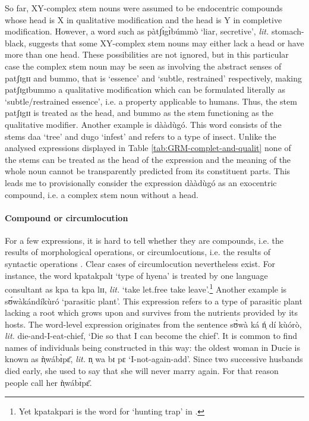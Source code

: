 \begin{exe}
\begin{exe}
\begin{exe}
\begin{exe}
\begin{exe}
\begin{exe}
So far,   XY-complex stem nouns were assumed to be  endocentric compounds whose head is X in qualitative modification and the head is Y in completive modification.  However, a word such as {\sls pàtʃɪ̀gɪ̀búmmò} `liar, secretive', {\it lit.} stomach-black, suggests that some XY-complex stem nouns may  either lack a head or have more than one head. These possibilities are not ignored, but in this particular case the complex stem noun may be seen as involving  the abstract senses of {\sls patʃɪgɪɪ} and {\sls bummo}, that is  `essence' and `subtle, restrained' respectively, making {\sls patʃɪgɪbummo} a qualitative modification  which can be formulated literally as `subtle/restrained essence', i.e.   a property applicable to humans. Thus, the stem {\sls patʃɪgɪɪ} is treated as the head, and {\sls bummo} as the stem functioning as the qualitative modifier. Another example is {\sls dààdùgó}. This word consists of the stems {\sls daa} `tree' and  {\sls dugo} `infest'   and refers to a type   of insect. Unlike the analysed expressions displayed in  Table \ref{tab:GRM-complet-and-qualit}  none of the stems can be treated as the head of the expression and the meaning of the whole noun cannot be transparently  predicted from its constituent parts. This leads me to provisionally consider the expression {\sls dààdùgó}  as an exocentric compound, i.e. a complex stem noun without a head.


 
\paragraph{Compound or circumlocution}
\label{sec:GRM-comp-vs-circum}

For a few expressions,  it is hard to tell whether they are compounds, i.e. the results of  morphological operations, or circumlocutions, i.e.  the results of syntactic operations \citep[165]{Alla01}. Clear cases of circumlocution nevertheless exist. For instance,  the word {\sls kpatakpalɪ} `type of hyena'  is treated by one language consultant as {\sls kpa ta kpa lɪɪ},  {\it lit.} `take let.free take leave'.\footnote{Yet {\sls kpatakpari} is the word for `hunting trap' in  \citep{Rytz66}.}  Another example is {\sls sʊ́wàkándíkùró} `parasitic plant'. This expression refers to a type of parasitic plant lacking a  root which grows upon and survives from the nutrients provided by its  hosts. The word-level expression originates from the sentence  {\sls sʊ̀wà ká ń̩ dí kùórò}, {\it lit.}  die-and-I-eat-chief, `Die so that I can become the chief'. It is common to find names of individuals being constructed in this way: the oldest woman in Ducie is known as {\sls ǹ̩wábɪ̀pɛ̄}, {\it lit.}  {\sls n̩ wa bɪ pɛ}  `I-not-again-add'. Since two successive husbands died early,  she used to say that she will never marry again. For that reason people call her {\sls ǹ̩wábɪ̀pɛ̄}.  




\end{exe}
\end{exe}
\end{exe}
\end{exe}
\end{exe}
\end{exe}
